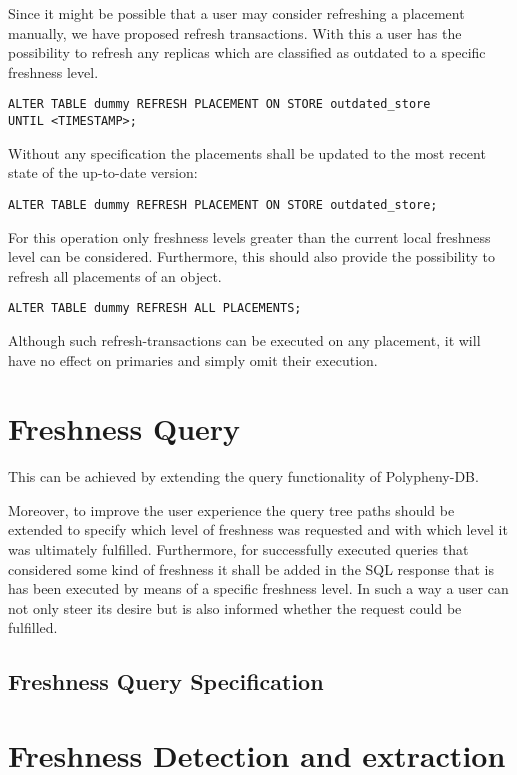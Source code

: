 Since it might be possible that a user may consider refreshing a placement manually, we have proposed refresh transactions. With this a user has the possibility to refresh
any replicas which are classified as outdated to a specific freshness level.
\begin{verbatim}
ALTER TABLE dummy REFRESH PLACEMENT ON STORE outdated_store 
UNTIL <TIMESTAMP>;
\end{verbatim}
Without any specification the placements shall be updated to the most recent state of the up-to-date version:
\begin{verbatim}
ALTER TABLE dummy REFRESH PLACEMENT ON STORE outdated_store;
\end{verbatim}

For this operation only freshness levels greater than the current local freshness level can be considered.
Furthermore, this should also provide the possibility to refresh all placements of an object.
\begin{verbatim}
ALTER TABLE dummy REFRESH ALL PLACEMENTS;
\end{verbatim}

Although such refresh-transactions can be executed on any placement, it will have no effect on primaries and simply omit their execution. 



\section{Freshness Query}
This can be achieved by extending the query functionality of Polypheny-DB.

Moreover, to improve the user experience the query tree paths should be extended to specify which level of freshness was requested and with which level it was 
ultimately fulfilled. Furthermore, for successfully executed queries that considered some kind of freshness it shall be added in the SQL response that is has been 
executed by means of a specific freshness level.
In such a way a user can not only steer its desire but is also informed whether the request could be fulfilled.

\subsection{Freshness Query Specification}

\section{Freshness Detection and extraction}

